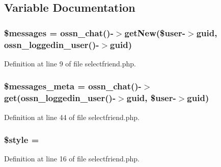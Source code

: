 \subsection{Variable Documentation}
\subsubsection[{\texorpdfstring{\$messages}{$messages}}]{\setlength{\rightskip}{0pt plus 5cm}\$messages = {\bf ossn\+\_\+chat}()-\/$>$get\+New(\${\bf user}-\/$>$guid, {\bf ossn\+\_\+loggedin\+\_\+user}()-\/$>$guid)}\hypertarget{selectfriend_8php_a21a183f927a6d243fe6b4ba3a6c4d4c8}{}\label{selectfriend_8php_a21a183f927a6d243fe6b4ba3a6c4d4c8}


Definition at line 9 of file selectfriend.\+php.

\subsubsection[{\texorpdfstring{\$messages\+\_\+meta}{$messages_meta}}]{\setlength{\rightskip}{0pt plus 5cm}\$messages\+\_\+meta = {\bf ossn\+\_\+chat}()-\/$>$get({\bf ossn\+\_\+loggedin\+\_\+user}()-\/$>$guid, \${\bf user}-\/$>$guid)}\hypertarget{selectfriend_8php_a41491145154f27f87919627d67255cac}{}\label{selectfriend_8php_a41491145154f27f87919627d67255cac}


Definition at line 44 of file selectfriend.\+php.

\subsubsection[{\texorpdfstring{\$style}{$style}}]{\setlength{\rightskip}{0pt plus 5cm}\$style = \textquotesingle{}\textquotesingle{}}\hypertarget{selectfriend_8php_a4b16ebd3ba5d6cd79dd64e240aec4a58}{}\label{selectfriend_8php_a4b16ebd3ba5d6cd79dd64e240aec4a58}


Definition at line 16 of file selectfriend.\+php.


